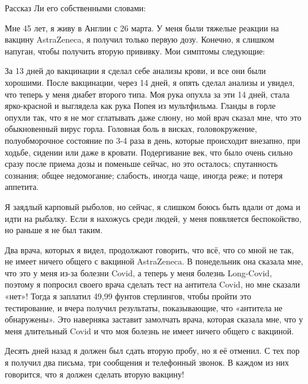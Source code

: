 Рассказ Ли его собственными словами:

Мне 45 лет, я живу в Англии с 26 марта. У меня были тяжелые реакции на вакцину
AstraZeneca, я получил только первую дозу. Конечно, я слишком напуган, чтобы
получить вторую прививку. Мои симптомы следующие:

За 13 дней до вакцинации я сделал себе анализы крови, и все они были
хорошими. После вакцинации, через 14 дней, я опять сделал анализы и увидел, что
теперь у меня диабет второго типа. Моя рука опухла за эти 14 дней, стала
ярко-красной и выглядела как рука Попея из мультфильма. Гланды в горле опухли
так, что я не мог сглатывать даже слюну, но мой врач сказал мне, что это
обыкновенный вирус горла. Головная боль в висках, головокружение, полуобморочное
состояние по 3-4 раза в день, которые происходит внезапно, при ходьбе, сидении
или даже в кровати. Подергивание век, что было очень сильно сразу после приема
дозы и поменьше сейчас, но это осталось; спутанность сознания; общее
недомогание; слабость, иногда чаще, иногда реже; и потеря аппетита.

Я заядлый карповый рыболов, но сейчас, я слишком боюсь быть вдали от дома и идти
на рыбалку. Если я нахожусь среди людей, у меня появляется беспокойство, но
раньше я не был таким.

Два врача, которых я видел, продолжают говорить, что всё, что со мной не так, не
имеет ничего общего с вакциной AstraZeneca. В понедельник она сказала мне, что
это у меня из-за болезни Covid, а теперь у меня болезнь Long-Covid, поэтому я
попросил своего врача сделать тест на антитела Covid, но мне сказали «нет»!
Тогда я заплатил 49,99 фунтов стерлингов, чтобы пройти это тестирование, и вчера
получил результаты, показывающие, что «антитела не обнаружены». Это наверняка
заставит замолчать врача, которая сказала мне, что у меня длительный Covid и что
моя болезнь не имеет ничего общего с вакциной.

Десять дней назад я должен был сдать вторую пробу, но я её отменил. С тех пор я
получил два письма, три сообщения и телефонный звонок. В каждом из них
говорится, что я должен сделать вторую вакцину!

